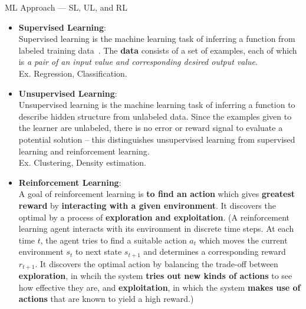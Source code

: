 \documentclass{bredelebeamer}
\begin{document}
\begin{frame}{ML Approach --- SL, UL, and RL}
  \begin{itemize}
    \item[SL]
    \begin{justify}
      \textbf{Supervised Learning}:\\
      Supervised learning is the machine learning task of inferring a function
      from labeled training data~\cite{Mohri:2012:FML:2371238}. The \textbf{data}
      consists of a set of examples, each of which is \textit{a pair of an input
      value and corresponding desired output value}.\\
      Ex. Regression, Classification.
    \end{justify}

    \item[UL]
    \begin{justify}
      \textbf{Unsupervised Learning}:\\
      Unsupervised learning is the machine learning task of inferring a function
      to describe hidden structure from unlabeled data. Since the examples given
      to the learner are unlabeled, there is no error or reward signal to
      evaluate a potential solution – this distinguishes unsupervised learning
      from supervised learning and reinforcement learning.\\
      Ex. Clustering, Density estimation.
    \end{justify}

    \item[RL]
    \begin{justify}
      \textbf{Reinforcement Learning}:\\
      A goal of reinforcement learning is \textbf{to find an action} which gives
      \textbf{greatest reward} by \textbf{interacting with a given environment}.
      It discovers the optimal by a process of \textbf{exploration and exploitation}.
      (A reinforcement learning agent interacts with its environment in discrete
      time steps. At each time $t$, the agent tries to find a suitable action
      $a_{t}$ which moves the current environment $s_{t}$ to next state $s_{t+1}$
      and determines a corresponding reward $r_{t+1}$. It discovers the optimal
      action by balancing the trade-off between \textbf{exploration}, in whcih
      the system \textbf{tries out new kinds of actions} to see how effective
      they are, and \textbf{exploitation}, in which the system \textbf{makes
      use of actions} that are known to yield a high reward.)
    \end{justify}
  \end{itemize}
\end{frame}
\end{document}
